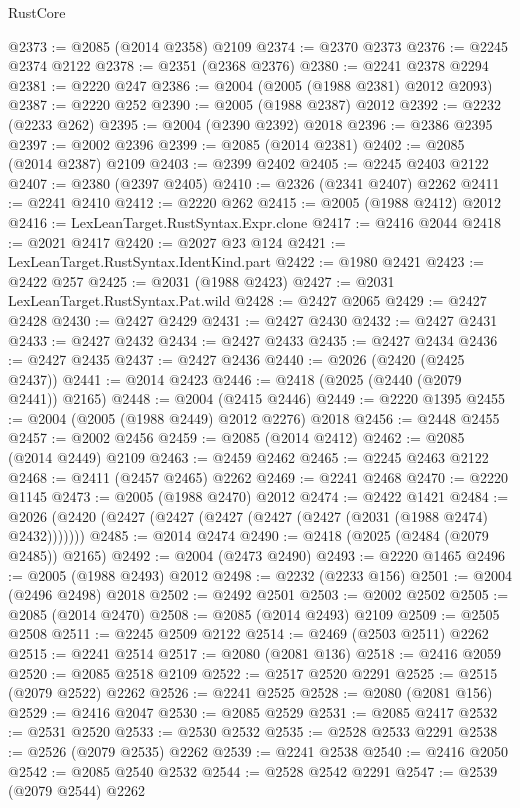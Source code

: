 \begin{lexlean}{RustCore}
\begin{coremodule}
@2373 := @2085 (@2014 @2358) @2109
@2374 := @2370 @2373
@2376 := @2245 @2374 @2122
@2378 := @2351 (@2368 @2376)
@2380 := @2241 @2378 @2294
@2381 := @2220 @247
@2386 := @2004 (@2005 (@1988 @2381) @2012 @2093)
@2387 := @2220 @252
@2390 := @2005 (@1988 @2387) @2012
@2392 := @2232 (@2233 @262)
@2395 := @2004 (@2390 @2392) @2018
@2396 := @2386 @2395
@2397 := @2002 @2396
@2399 := @2085 (@2014 @2381)
@2402 := @2085 (@2014 @2387) @2109
@2403 := @2399 @2402
@2405 := @2245 @2403 @2122
@2407 := @2380 (@2397 @2405)
@2410 := @2326 (@2341 @2407) @2262
@2411 := @2241 @2410
@2412 := @2220 @262
@2415 := @2005 (@1988 @2412) @2012
@2416 := LexLeanTarget.RustSyntax.Expr.clone
@2417 := @2416 @2044
@2418 := @2021 @2417
@2420 := @2027 @23 @124
@2421 := LexLeanTarget.RustSyntax.IdentKind.part
@2422 := @1980 @2421
@2423 := @2422 @257
@2425 := @2031 (@1988 @2423)
@2427 := @2031 LexLeanTarget.RustSyntax.Pat.wild
@2428 := @2427 @2065
@2429 := @2427 @2428
@2430 := @2427 @2429
@2431 := @2427 @2430
@2432 := @2427 @2431
@2433 := @2427 @2432
@2434 := @2427 @2433
@2435 := @2427 @2434
@2436 := @2427 @2435
@2437 := @2427 @2436
@2440 := @2026 (@2420 (@2425 @2437))
@2441 := @2014 @2423
@2446 := @2418 (@2025 (@2440 (@2079 @2441)) @2165)
@2448 := @2004 (@2415 @2446)
@2449 := @2220 @1395
@2455 := @2004 (@2005 (@1988 @2449) @2012 @2276) @2018
@2456 := @2448 @2455
@2457 := @2002 @2456
@2459 := @2085 (@2014 @2412)
@2462 := @2085 (@2014 @2449) @2109
@2463 := @2459 @2462
@2465 := @2245 @2463 @2122
@2468 := @2411 (@2457 @2465) @2262
@2469 := @2241 @2468
@2470 := @2220 @1145
@2473 := @2005 (@1988 @2470) @2012
@2474 := @2422 @1421
@2484 := @2026 (@2420 (@2427 (@2427 (@2427 (@2427 (@2427 (@2031 (@1988 @2474) @2432)))))))
@2485 := @2014 @2474
@2490 := @2418 (@2025 (@2484 (@2079 @2485)) @2165)
@2492 := @2004 (@2473 @2490)
@2493 := @2220 @1465
@2496 := @2005 (@1988 @2493) @2012
@2498 := @2232 (@2233 @156)
@2501 := @2004 (@2496 @2498) @2018
@2502 := @2492 @2501
@2503 := @2002 @2502
@2505 := @2085 (@2014 @2470)
@2508 := @2085 (@2014 @2493) @2109
@2509 := @2505 @2508
@2511 := @2245 @2509 @2122
@2514 := @2469 (@2503 @2511) @2262
@2515 := @2241 @2514
@2517 := @2080 (@2081 @136)
@2518 := @2416 @2059
@2520 := @2085 @2518 @2109
@2522 := @2517 @2520 @2291
@2525 := @2515 (@2079 @2522) @2262
@2526 := @2241 @2525
@2528 := @2080 (@2081 @156)
@2529 := @2416 @2047
@2530 := @2085 @2529
@2531 := @2085 @2417
@2532 := @2531 @2520
@2533 := @2530 @2532
@2535 := @2528 @2533 @2291
@2538 := @2526 (@2079 @2535) @2262
@2539 := @2241 @2538
@2540 := @2416 @2050
@2542 := @2085 @2540 @2532
@2544 := @2528 @2542 @2291
@2547 := @2539 (@2079 @2544) @2262

\end{coremodule}
\end{lexlean}
